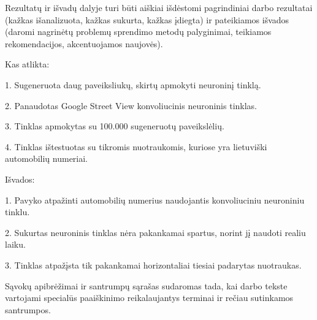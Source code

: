 \documentclass{VUMIFPSkursinis}
\begin{document}
Rezultatų ir išvadų dalyje turi būti aiškiai išdėstomi pagrindiniai darbo
rezultatai (kažkas išanalizuota, kažkas sukurta, kažkas įdiegta) ir pateikiamos
išvados (daromi nagrinėtų problemų sprendimo metodų palyginimai, teikiamos
rekomendacijos, akcentuojamos naujovės).

Kas atlikta:

1. Sugeneruota daug paveiksliukų, skirtų apmokyti neuroninį tinklą.

2. Panaudotas Google Street View konvoliucinis neuroninis tinklas.

3. Tinklas apmokytas su 100.000 sugeneruotų paveikslėlių.

4. Tinklas ištestuotas su tikromis nuotraukomis, kuriose yra lietuviški automobilių numeriai.

Išvados:

1. Pavyko atpažinti automobilių numerius naudojantis konvoliuciniu neuroniniu tinklu.

2. Sukurtas neuroninis tinklas nėra pakankamai spartus, norint jį naudoti realiu laiku.

3. Tinklas atpažįsta tik pakankamai horizontaliai tiesiai padarytas nuotraukas.


\printbibliography[heading=bibintoc]  %

Sąvokų apibrėžimai ir santrumpų sąrašas sudaromas tada, kai darbo tekste
vartojami specialūs paaiškinimo reikalaujantys terminai ir rečiau sutinkamos
santrumpos.

\appendix  %
\end{document}
